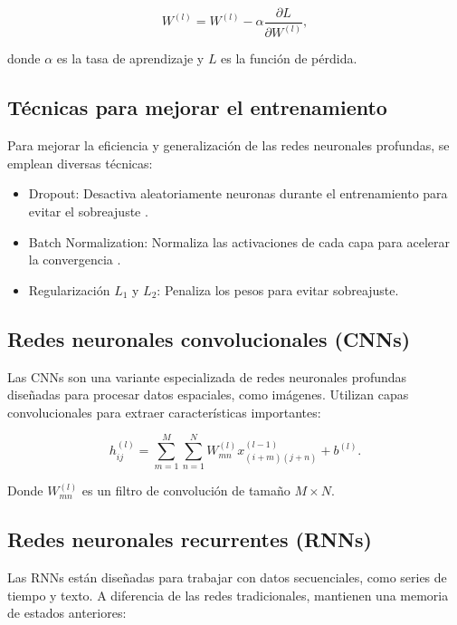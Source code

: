 \begin{itemize}
\begin{enumerate}
			\begin{equation}
				W^{(l)} = W^{(l)} - \alpha \frac{\partial L}{\partial W^{(l)}},
			\end{equation}
			
			donde \( \alpha \) es la tasa de aprendizaje y \( L \) es la función de pérdida.
		\end{enumerate}
		
		\subsection{Técnicas para mejorar el entrenamiento}
		
		Para mejorar la eficiencia y generalización de las redes neuronales profundas, se emplean diversas técnicas:
		
		\begin{itemize}
			\item Dropout: Desactiva aleatoriamente neuronas durante el entrenamiento para evitar el sobreajuste \cite{srivastava2014dropout}.
			\item Batch Normalization: Normaliza las activaciones de cada capa para acelerar la convergencia \cite{ioffe2015batch}.
			\item Regularización \(L_1\) y \(L_2\): Penaliza los pesos para evitar sobreajuste.
		\end{itemize}
		
		\subsection{Redes neuronales convolucionales (CNNs)}
		
		Las CNNs son una variante especializada de redes neuronales profundas diseñadas para procesar datos espaciales, como imágenes. Utilizan capas convolucionales para extraer características importantes:
		
		\begin{equation}
			h_{ij}^{(l)} = \sum_{m=1}^{M} \sum_{n=1}^{N} W_{mn}^{(l)} x_{(i+m)(j+n)}^{(l-1)} + b^{(l)}.
		\end{equation}
		
		Donde \( W_{mn}^{(l)} \) es un filtro de convolución de tamaño \( M \times N \).
		
		\subsection{Redes neuronales recurrentes (RNNs)}
		
		Las RNNs están diseñadas para trabajar con datos secuenciales, como series de tiempo y texto. A diferencia de las redes tradicionales, mantienen una memoria de estados anteriores:
		

\end{itemize}
